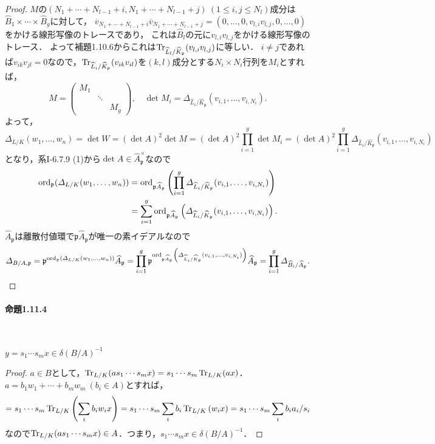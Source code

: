 \begin{proof}
  $M$の$(N_1+\cdots+N_{l-1}+i,N_1+\cdots+N_{l-1}+j)\ (1\leq i,j\leq N_l)$成分は$\widehat{B}_1\times\cdots\times\widehat{B}_g$に対して，
  $\overline{v}_{N_1+\cdots+N_{l-1}+i}\overline{v}_{N_1+\cdots+N_{l-1}+j}=(0,\ldots,0,v_{l,i}v_{l,j},0,\ldots,0)$をかける線形写像のトレースであり，
  これは$\widehat{B}_l$の元に$v_{l,i}v_{l,j}$をかける線形写像のトレース．
  よって補題1.10.6からこれは$\operatorname{Tr}_{\widehat{L}_l/\widehat{K}_\mathfrak{p}}(v_{l,i}v_{l,j})$に等しい．
  $i\neq j$であれば$v_{ik}v_{jl}=0$なので，$\operatorname{Tr}_{\widehat{L}_i/\widehat{K}_\mathfrak{p}}(v_{ik}v_{il})$を$(k,l)$成分とする$N_i\times N_i$行列を$M_i$とすれば，
  \[
  M=
  \begin{pmatrix}
    M_1 &        & \\
    & \ddots & \\
    &        & M_g
  \end{pmatrix}
  ,\quad \det M_i = \varDelta_{\widehat{L}_i/\widehat{K}_\mathfrak{p}}(v_{i,1},\ldots,v_{i,N_i}).\]
  よって，
  \[\varDelta_{L/K}(w_1,\ldots,w_n) = \det W = (\det A)^2 \det M = (\det A)^2 \prod_{i=1}^g \det M_i = (\det A)^2 \prod_{i=1}^g\varDelta_{\widehat{L}_i/\widehat{K}_\mathfrak{p}}(v_{i,1},\ldots,v_{i,N_i})\]
  となり，系I-6.7.9 (1)から$\det A \in \widehat{A}_\mathfrak{p}^\times$なので
  \begin{align*}
    \operatorname{ord}_{\mathfrak{p}}(\varDelta_{L/K}(w_1,\ldots,w_n)) &= \operatorname{ord}_{\mathfrak{p}\widehat{A}_\mathfrak{p}}\left(\prod_{i=1}^g\varDelta_{\widehat{L}_i/\widehat{K}_\mathfrak{p}}(v_{i,1},\ldots,v_{i,N_i})\right) \\
    &= \sum_{i = 1}^g\operatorname{ord}_{\mathfrak{p}\widehat{A}_\mathfrak{p}}\left(\varDelta_{\widehat{L}_i/\widehat{K}_\mathfrak{p}}(v_{i,1},\ldots,v_{i,N_i})\right).
  \end{align*}
  $\widehat{A}_\mathfrak{p}$は離散付値環で$\mathfrak{p}\widehat{A}_\mathfrak{p}$が唯一の素イデアルなので
  \[\varDelta_{B/A,\mathfrak{p}} = \mathfrak{p}^{\operatorname{ord}_{\mathfrak{p}}(\varDelta_{L/K}(w_1,\ldots,w_n))}\widehat{A}_\mathfrak{p} = \prod_{i = 1}^g\mathfrak{p}^{\operatorname{ord}_{\mathfrak{p}\widehat{A}_\mathfrak{p}}\left(\varDelta_{\widehat{L}_i/\widehat{K}_\mathfrak{p}}(v_{i,1},\ldots,v_{i,N_i})\right)}\widehat{A}_\mathfrak{p} = \prod_{i=1}^g\varDelta_{\widehat{B}_i/\widehat{A}_\mathfrak{p}}.\]
\end{proof}

\paragraph{命題1.11.4}~
\begin{screen}
  $y=s_1\cdots s_mx\in\delta(B/A)^{-1}$
\end{screen}
\begin{proof}
  $a\in B$として，$\operatorname{Tr}_{L/K}(as_1\cdots s_mx)=s_1\cdots s_m\operatorname{Tr}_{L/K}(ax)$．
  $a=b_1w_1+\cdots+b_mw_m\ (b_i\in A)$とすれば，
  \[=s_1\cdots s_m\operatorname{Tr}_{L/K}\left(\sum_ib_iw_ix\right)=s_1\cdots s_m\sum_ib_i\operatorname{Tr}_{L/K}\left(w_ix\right)=s_1\cdots s_m\sum_ib_ia_i/s_i\]
  なので$\operatorname{Tr}_{L/K}(as_1\cdots s_mx)\in A$．つまり，$s_1\cdots s_mx\in\delta(B/A)^{-1}$．
\end{proof}

